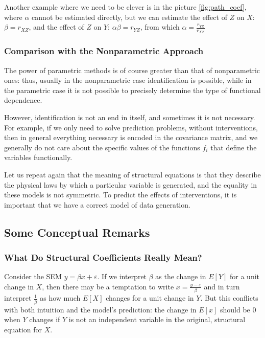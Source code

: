 \documentclass[fleqn]{article}
\numberwithin{equation}{section}
\numberwithin{theorem}{section}
\numberwithin{figure}{section}
\numberwithin{lemma}{section}
\numberwithin{corollary}{section}
\begin{document}
Another example where we need to be clever is in the picture \ref{fig:path_coef}, where $\alpha$ cannot be estimated directly, but we can estimate the effect of $Z$ on $X$: $\beta = r_{XZ}$, and the effect of $Z$ on $Y$: $\alpha \beta = r_{YZ}$, from which $\alpha = \frac{r_{YZ}}{r_{XZ}}$

\subsubsection*{Comparison with the Nonparametric Approach}

The power of parametric methods is of course greater than that of nonparametric ones: thus, usually in the nonparametric case identification is possible, while in the parametric case it is not possible to precisely determine the type of functional dependence.

However, identification is not an end in itself, and sometimes it is not necessary. For example, if we only need to solve prediction problems, without interventions, then in general everything necessary is encoded in the covariance matrix, and we generally do not care about the specific values of the functions $f_i$ that define the variables functionally.

Let us repeat again that the meaning of structural equations is that they describe the physical laws by which a particular variable is generated, and the equality in these models is not symmetric. To predict the effects of interventions, it is important that we have a correct model of data generation.

\subsection*{Some Conceptual Remarks}

\subsubsection*{What Do Structural Coefficients Really Mean?}

Consider the SEM $y = \beta x + \varepsilon$. If we interpret $\beta$ as the change in $E[Y]$ for a unit change in $X$, then there may be a temptation to write $x = \frac{y - \varepsilon}{\beta}$ and in turn interpret $\frac{1}{\beta}$ as how much $E[X]$ changes for a unit change in $Y$. But this conflicts with both intuition and the model's prediction: the change in $E[x]$ should be 0 when $Y$ changes if $Y$ is not an independent variable in the original, structural equation for $X$.
\end{document}
